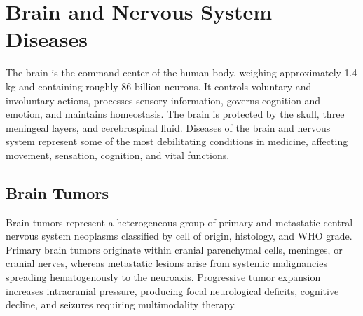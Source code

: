 \chapter{Brain and Nervous System Diseases}
\label{ch:brain}
The brain is the command center of the human body, weighing approximately 1.4 kg and containing roughly 86 billion neurons. It controls voluntary and involuntary actions, processes sensory information, governs cognition and emotion, and maintains homeostasis. The brain is protected by the skull, three meningeal layers, and cerebrospinal fluid. Diseases of the brain and nervous system represent some of the most debilitating conditions in medicine, affecting movement, sensation, cognition, and vital functions.

\section{Brain Tumors}




Brain tumors represent a heterogeneous group of primary and metastatic central nervous system neoplasms classified by cell of origin, histology, and WHO grade. Primary brain tumors originate within cranial parenchymal cells, meninges, or cranial nerves, whereas metastatic lesions arise from systemic malignancies spreading hematogenously to the neuroaxis. Progressive tumor expansion increases intracranial pressure, producing focal neurological deficits, cognitive decline, and seizures requiring multimodality therapy.





\label{sec:Brain Tumors}

